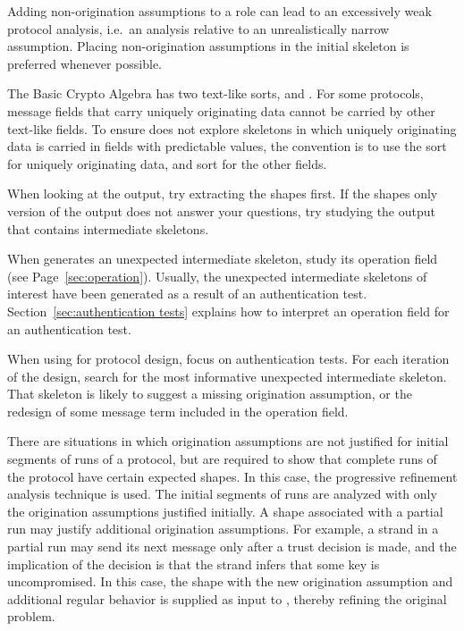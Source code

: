 \documentclass[12pt]{article}
\begin{document}
Adding non-origination assumptions to a role can lead to an
excessively weak protocol analysis, i.e.\ an analysis relative to an
unrealistically narrow assumption.  Placing non-origination
assumptions in the initial skeleton is preferred whenever possible.

The Basic Crypto Algebra has two text-like sorts,  and
.  For some protocols, message fields that carry uniquely
originating data cannot be carried by other text-like fields.  To
ensure {\cpsa} does not explore skeletons in which uniquely
originating data is carried in fields with predictable values, the
convention is to use the sort  for uniquely originating
data, and sort  for the other fields.

When looking at the output, try extracting the shapes first.  If the
shapes only version of the output does not answer your questions, try
studying the output that contains intermediate skeletons.

When {\cpsa} generates an unexpected intermediate skeleton, study its
operation field (see Page~\ref{sec:operation}).  Usually, the
unexpected intermediate skeletons of interest have been generated as a
result of an authentication test.  Section~\ref{sec:authentication
  tests} explains how to interpret an operation field for an
authentication test.

When using {\cpsa} for protocol design, focus on authentication tests.
For each iteration of the design, search for the most informative
unexpected intermediate skeleton.  That skeleton is likely to suggest
a  missing origination assumption, or the redesign of some message
term included in the operation field.

There are situations in which origination assumptions are not
justified for initial segments of runs of a protocol, but are required
to show that complete runs of the protocol have certain expected
shapes.  In this case, the progressive refinement analysis technique
is used.  The initial segments of runs are analyzed with only the
origination assumptions justified initially.  A shape associated with
a partial run may justify additional origination assumptions.  For
example, a strand in a partial run may send its next message only
after a trust decision is made, and the implication of the decision is
that the strand infers that some key is uncompromised.  In this
case, the shape with the new origination assumption and additional
regular behavior is supplied as input to {\cpsa}, thereby refining the
original problem.
\end{document}
